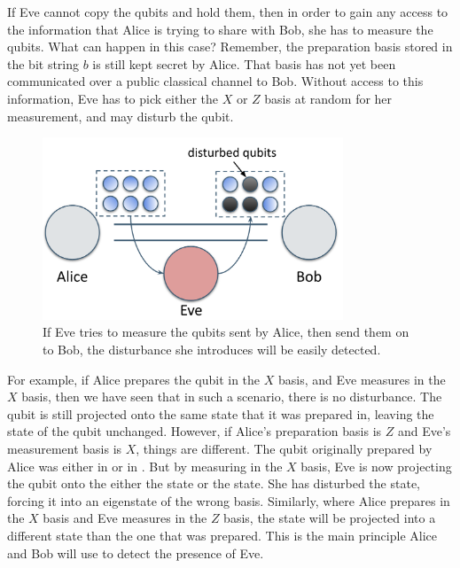 If Eve cannot copy the qubits and hold them, then in order to gain any access to the information that Alice is trying to share with Bob, she has to measure the qubits. What can happen in this case? Remember, the preparation basis stored in the bit string $b$ is still kept secret by Alice. That basis has not yet been communicated over a public classical channel to Bob. Without access to this information, Eve has to pick either the $X$ or $Z$ basis at random for her measurement, and may disturb the qubit.

\begin{figure}[H]
    \centering
    \includegraphics[width=0.8\textwidth]{lesson9/eve-disturbance.png}
        \caption[Eve's measurements disturb the qubits]{If Eve tries to measure  the qubits sent by Alice, then send them on to Bob, the disturbance she introduces will be easily detected.}
    \label{fig:eve-disturbance}
\end{figure}

For example, if Alice prepares the qubit in the $X$ basis, and Eve measures in the $X$ basis, then we have seen that in such a scenario, there is no disturbance. The qubit is still projected onto the same state that it was prepared in, leaving the state of the qubit unchanged. However, if Alice's preparation basis is $Z$ and Eve's measurement basis is $X$, things are different. The qubit originally prepared by Alice was either in  or in .  But by measuring in the $X$ basis, Eve is now projecting the qubit onto the either the \ket{+} state or the \ket{-} state. She has disturbed the state, forcing it into an eigenstate of the wrong basis. Similarly, where Alice prepares in the $X$ basis and Eve measures in the $Z$ basis, the state will be projected into a different state than the one that was prepared. This is the main principle Alice and Bob will use to detect the presence of Eve.


